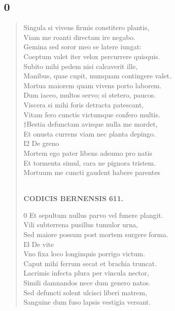 \documentclass[11pt, a4paper]{report}
\begin{document}
            \subsection*{0}
      \begin{verse}
      Singula si vivens firmis constitero plantis, \\ Viam me roanti directam ire negabo. \\ Gemina sed soror meo se latere iungat: \\ Coeptum valet iter velox percurrere quisquis. \\ Subito mihi pedem nisi calcaverit ille, \\ Manibus, quae cupit, numquam contingere valet. \\ Mortua maiorem quam vivens porto laborem. \\ Dum iaceo, multos servo; si stetero, paucos. \\ Viscera si mihi foris detracta patescant, \\ Vitam fero cunctis victumque confero multis. \\ †Bestia defunctam avisque nulla me mordet, \\ Et onusta currens viam nec planta depingo. \\ I2 De greno \\ Mortem ego pater libens adsumo pro natis \\ Et tormenta simul, cara ne pignora tristem. \\ Mortuum me cuncti gaudent habere parentes \\ 
        ﻿\pagebreak 
    \begin{center} \textbf{CODICIS BERNENSIS 611.} \end{center} \marginpar{[355]} 0 Et sepultum nullus parvo vel funere plangit. \\ Vili subterrena pusillus tumulor urna, \\ Sed maiore possum post mortem surgere forma. \\ I3 De vite \\ Vno fixa loco longinquis porrigo victum. \\ Caput mihi ferrum secat et brachia truncat. \\ Lacrimis infecta plura per vincula nector, \\ Simili damnandos nece dum genero natos. \\ Sed defuncti solent ulcisci liberi matrem, \\ Sanguine dum fuso lapsis vestigia versant. \\ 
      \end{verse}
  
\end{document}
